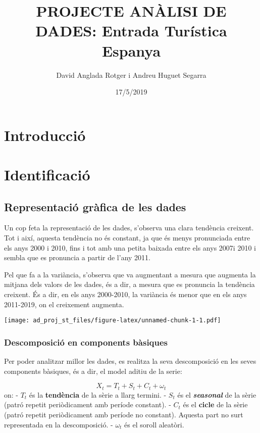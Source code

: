 \documentclass[]{article}
\title{PROJECTE ANÀLISI DE DADES: Entrada Turística Espanya}
\author{David Anglada Rotger i Andreu Huguet Segarra}
\date{17/5/2019}
\begin{document}
\maketitle

{
\setcounter{tocdepth}{2}
\tableofcontents
}
\section{Introducció}\label{introduccio}

\section{Identificació}\label{identificacio}

\subsection{Representació gràfica de les
dades}\label{representacio-grafica-de-les-dades}

Un cop feta la representació de les dades, s'observa una clara tendència
creixent. Tot i així, aquesta tendència no és constant, ja que és menys
pronunciada entre els anys 2000 i 2010, fins i tot amb una petita
baixada entre els anys 2007i 2010 i sembla que es pronuncia a partir de
l'any 2011.

Pel que fa a la variància, s'observa que va augmentant a mesura que
augmenta la mitjana dels valors de les dades, és a dir, a mesura que es
pronuncia la tendència creixent. És a dir, en els anys 2000-2010, la
variància és menor que en els anys 2011-2019, on el creixement augmenta.

\texttt{[image: ad\_proj\_st\_files/figure-latex/unnamed-chunk-1-1.pdf]}

\subsubsection{Descomposició en components
bàsiques}\label{descomposicio-en-components-basiques}

Per poder analitzar millor les dades, es realitza la seva descomposició
en les seves components bàsiques, és a dir, el model aditiu de la serie:

\[ X_t = T_t + S_t + C_t + \omega_t \] on: - \(T_t\) és la
\textbf{tendència} de la sèrie a llarg termini. - \(S_t\) és el
\textbf{\emph{seasonal}} de la sèrie (patró repetit periòdicament amb
període constant). - \(C_t\) és el \textbf{cicle} de la sèrie (patró
repetit periòdicament amb període no constant). Aquesta part no surt
representada en la descomposició. - \(\omega_t\) és el soroll aleatòri.
\end{document}
